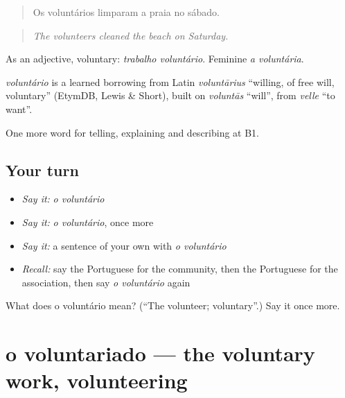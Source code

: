 \begin{quote}
Os voluntários limparam a praia no sábado.
\end{quote}

\begin{quote}
\emph{The volunteers cleaned the beach on Saturday.}
\end{quote}

As an adjective, voluntary: \emph{trabalho voluntário}. Feminine \emph{a voluntária}.

\begin{cousinweb}
\emph{voluntário} is a learned borrowing from Latin \emph{voluntārius} \textquotedblleft{}willing, of free will, voluntary\textquotedblright{} (EtymDB, Lewis \& Short), built on \emph{voluntās} \textquotedblleft{}will\textquotedblright{}, from \emph{velle} \textquotedblleft{}to want\textquotedblright{}.
\end{cousinweb}

\begin{grammarlens}[title={What you've built}]
One more word for telling, explaining and describing at B1.
\end{grammarlens}

\subsection*{Your turn}
\begin{itemize}
\raggedright
  \item \emph{Say it:} \emph{o voluntário}
  \item \emph{Say it:} \emph{o voluntário}, once more
  \item \emph{Say it:} a sentence of your own with \emph{o voluntário}
  \item \emph{Recall:} say the Portuguese for the community, then the Portuguese for the association, then say \emph{o voluntário} again
\end{itemize}

\begin{tcolorbox}[breakable,colback=teal!4,colframe=teal!35!black,title={Before you move on}]
What does o voluntário mean? (\textquotedblleft{}The volunteer; voluntary\textquotedblright{}.) Say it once more.
\end{tcolorbox}
\section[o voluntariado]{o voluntariado — the voluntary work, volunteering}

